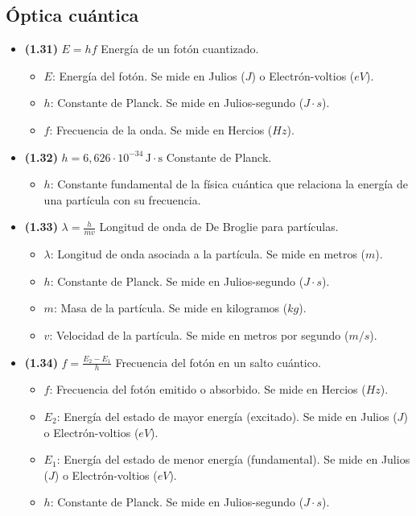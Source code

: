 \documentclass{article}
\begin{document}
		\subsection*{Óptica cuántica}
			\begin{itemize}
				\item \textbf{(1.31)} $\boxed{E=hf}$ Energía de un fotón cuantizado.
					\begin{itemize}
						\item $E$: Energía del fotón. Se mide en Julios ($J$) o Electrón-voltios ($eV$).
						\item $h$: Constante de Planck. Se mide en Julios-segundo ($J\cdot s$).
						\item $f$: Frecuencia de la onda. Se mide en Hercios ($Hz$).
					\end{itemize}    

				\item \textbf{(1.32)} $\boxed{h=6,626\cdot10^{-34}\,\text{J}\cdot\text{s}}$ Constante de Planck.
					\begin{itemize}
						\item $h$: Constante fundamental de la física cuántica que relaciona la energía de una partícula con su frecuencia.
					\end{itemize}

				\item \textbf{(1.33)} $\boxed{\lambda=\frac{h}{mv}}$ Longitud de onda de De Broglie para partículas.
					\begin{itemize}
						\item $\lambda$: Longitud de onda asociada a la partícula. Se mide en metros ($m$).
						\item $h$: Constante de Planck. Se mide en Julios-segundo ($J\cdot s$).
						\item $m$: Masa de la partícula. Se mide en kilogramos ($kg$).
						\item $v$: Velocidad de la partícula. Se mide en metros por segundo ($m/s$).
					\end{itemize}

				\item \textbf{(1.34)} $\boxed{f=\frac{E_{2}-E_{1}}{h}}$ Frecuencia del fotón en un salto cuántico.
					\begin{itemize}
						\item $f$: Frecuencia del fotón emitido o absorbido. Se mide en Hercios ($Hz$).
						\item $E_2$: Energía del estado de mayor energía (excitado). Se mide en Julios ($J$) o Electrón-voltios ($eV$).
						\item $E_1$: Energía del estado de menor energía (fundamental). Se mide en Julios ($J$) o Electrón-voltios ($eV$).
						\item $h$: Constante de Planck. Se mide en Julios-segundo ($J\cdot s$).
					\end{itemize}


\end{itemize}
\end{document}

